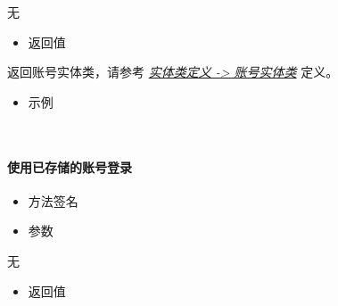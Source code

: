 \documentclass[letterpaper,10pt,english]{sphinxmanual}
\begin{document}
无
\begin{itemize}
\item {} 
返回值

\end{itemize}

返回账号实体类，请参考 {\hyperref[\detokenize{csharp:account}]{\emph{实体类定义 -\textgreater{} 账号实体类}}} 定义。
\begin{itemize}
\item {} 
示例

\end{itemize}

%
\begin{sphinxVerbatim}[commandchars=\\\{\}]
   
   
 
   
\end{sphinxVerbatim}

​


\paragraph{使用已存储的账号登录}
\label{\detokenize{csharp:id27}}\begin{itemize}
\item {} 
方法签名

\end{itemize}

%
\begin{sphinxVerbatim}[commandchars=\\\{\}]
    
\end{sphinxVerbatim}
\begin{itemize}
\item {} 
参数

\end{itemize}

无
\begin{itemize}
\item {} 
返回值

\end{itemize}
\end{document}
